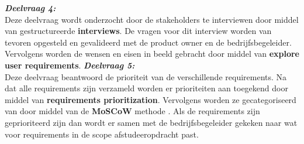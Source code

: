 \textit{\textbf{Deelvraag 4:} \SubquestionFour} \\
Deze deelvraag wordt onderzocht door de stakeholders te interviewen door middel van gestructureerde \textbf{interviews}. 
De vragen voor dit interview worden van tevoren opgesteld en gevalideerd met de product owner en de bedrijfsbegeleider.
Vervolgens worden de wensen en eisen in beeld gebracht door middel van \textbf{explore user requirements}.
\whitespace
\textit{\textbf{Deelvraag 5:} \SubquetionFive} \\
Deze deelvraag beantwoord de prioriteit van de verschillende requirements.
Na dat alle requirements zijn verzameld worden er prioriteiten aan toegekend door middel van \textbf{requirements prioritization}.
Vervolgens worden ze  gecategoriseerd van door middel van de \textbf{MoSCoW} methode \Parencite{MoSCoW}. 
Als de requirements zijn geprioriteerd zijn dan wordt er samen met de bedrijfsbegeleider gekeken naar wat voor requirements in de scope afstudeeropdracht past.
